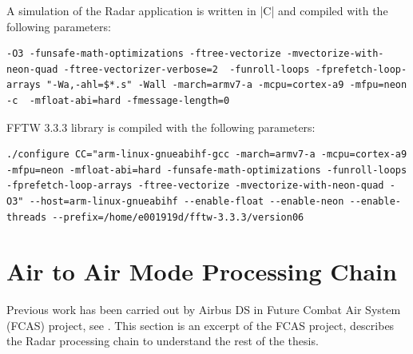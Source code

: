 \noindent
A simulation of the Radar application is written in \bverb|C| and compiled with the following parameters:

\begin{lstlisting}
-O3 -funsafe-math-optimizations -ftree-vectorize -mvectorize-with-neon-quad -ftree-vectorizer-verbose=2  -funroll-loops -fprefetch-loop-arrays "-Wa,-ahl=$*.s" -Wall -march=armv7-a -mcpu=cortex-a9 -mfpu=neon -c  -mfloat-abi=hard -fmessage-length=0
\end{lstlisting}

\vspace{5mm}
\noindent
FFTW 3.3.3 library is compiled with the following parameters:
\begin{lstlisting}
./configure CC="arm-linux-gnueabihf-gcc -march=armv7-a -mcpu=cortex-a9 -mfpu=neon -mfloat-abi=hard -funsafe-math-optimizations -funroll-loops -fprefetch-loop-arrays -ftree-vectorize -mvectorize-with-neon-quad -O3" --host=arm-linux-gnueabihf --enable-float --enable-neon --enable-threads --prefix=/home/e001919d/fftw-3.3.3/version06
\end{lstlisting}

\section{Air to Air Mode Processing Chain}
\label{sec:bg_related_work:proc_chain}
Previous work has been carried out by Airbus DS in Future Combat Air System (FCAS) project, see \cite{fcas}. This section is an excerpt of the FCAS project, describes the Radar processing chain to understand the rest of the thesis.

